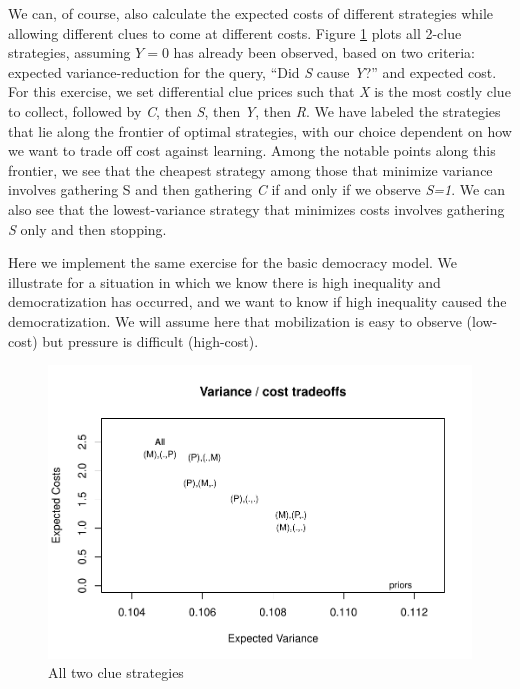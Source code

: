 \documentclass[
  12pt,
]{book}
\begin{document}
We can, of course, also calculate the expected costs of different strategies while allowing different clues to come at different costs. Figure \ref{fig:strategies} plots all 2-clue strategies, assuming \(Y=0\) has already been observed, based on two criteria: expected variance-reduction for the query, ``Did \emph{S} cause \emph{Y}?'' and expected cost. For this exercise, we set differential clue prices such that \emph{X} is the most costly clue to collect, followed by \emph{C}, then \emph{S}, then \emph{Y}, then \emph{R}. We have labeled the strategies that lie along the frontier of optimal strategies, with our choice dependent on how we want to trade off cost against learning. Among the notable points along this frontier, we see that the cheapest strategy among those that minimize variance involves gathering S and then gathering \emph{C} if and only if we observe \emph{S=1}. We can also see that the lowest-variance strategy that minimizes costs involves gathering \emph{S} only and then stopping.

Here we implement the same exercise for the basic democracy model. We illustrate for a situation in which we know there is high inequality and democratization has occurred, and we want to know if high inequality caused the democratization. We will assume here that mobilization is easy to observe (low-cost) but pressure is difficult (high-cost).

\begin{figure}

{\centering \includegraphics{ii_files/figure-latex/strategies-1} 

}

\caption{All two clue strategies}\label{fig:strategies}
\end{figure}
\end{document}

